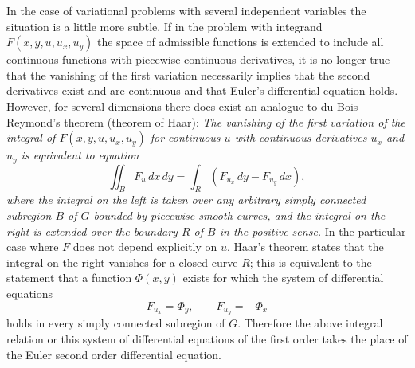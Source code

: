 In the case of variational problems with several independent variables the situation is a little more subtle. If in the problem with integrand $F(x,y,u,u_x,u_y)$ the space of admissible functions is extended to include all continuous functions with piecewise continuous derivatives, it is no longer true that the vanishing of the first variation necessarily implies that the second derivatives exist and are continuous and that Euler's differential equation holds. However, for several dimensions there does exist an analogue to du Bois-Reymond's theorem (theorem of Haar): \emph{The vanishing of the first variation of the integral of $F(x,y,u,u_x,u_y)$ for continuous $u$ with continuous derivatives $u_x$ and $u_y$ is equivalent to equation}
\begin{equation}\tag{35}
\iint_B F_u\,dx\,dy=\int_R(F_{u_x}\,dy-F_{u_y}\,dx),
\end{equation}
\emph{where the integral on the left is taken over any arbitrary simply connected subregion $B$ of $G$ bounded by piecewise smooth curves, and the integral on the right is extended over the boundary $R$ of $B$ in the positive sense.} In the particular case where $F$ does not depend explicitly on $u$, Haar's theorem states that the integral on the right vanishes for a closed curve $R$; this is equivalent to the statement that a function $\Phi(x,y)$ exists for which the system of differential equations
\[
F_{u_x}=\Phi_y,
\qquad
F_{u_y}=-\Phi_x
\]
holds in every simply connected subregion of $G$. Therefore the above integral relation or this system of differential equations of the first order takes the place of the Euler second order differential equation.

